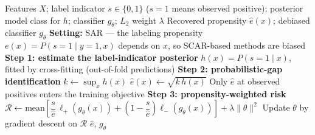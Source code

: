 \documentclass{article}
\begin{document}
\begin{algorithm}[!h]
\renewcommand{\algorithmicrequire}{\textbf{Input:}} %
\renewcommand{\algorithmicensure}{\textbf{Output:}} %
	\caption{Propensity-PU: probabilistic-gap (PG) propensity recovery under SAR} %
	\begin{algorithmic}[1] %
	    \REQUIRE
	    Features $X$; label indicator $s\in\{0,1\}$ ($s=1$ means observed positive);
	    posterior model class for $h$; classifier $g_{\theta}$; $L_{2}$ weight $\lambda$
	    \ENSURE
	    Recovered propensity $\hat{e}(x)$; debiased classifier $g_{\theta}$
	    \STATE \textbf{Setting:} SAR --- the labeling propensity $e(x)=P(s=1\mid y=1,x)$
	    depends on $x$, so SCAR-based methods are biased %
	    \STATE \textbf{Step 1: estimate the label-indicator posterior}
	    \STATE \quad $h(x)=P(s=1\mid x)$, fitted by cross-fitting (out-of-fold predictions) %
	    \STATE \textbf{Step 2: probabilistic-gap identification}
	    \STATE \quad $k\leftarrow \sup_{x}h(x)$
	    \STATE \quad $\hat{e}(x)\leftarrow \sqrt{k\,h(x)}$ %
	    \STATE \quad Only $\hat{e}$ at observed positives enters the training objective %
	    \STATE \textbf{Step 3: propensity-weighted risk}
	    \STATE $\mathcal{R}\leftarrow \mathrm{mean}\!\left[\dfrac{s}{\hat{e}}\,\ell_{+}(g_{\theta}(x))
	    +\left(1-\dfrac{s}{\hat{e}}\right)\ell_{-}(g_{\theta}(x))\right]+\lambda\|\theta\|^{2}$ %
	    \STATE Update $\theta$ by gradient descent on $\mathcal{R}$
	    \ENDWHILE
		\RETURN $\hat{e}$, $g_{\theta}$
	\end{algorithmic}
\end{algorithm}
\end{document}
